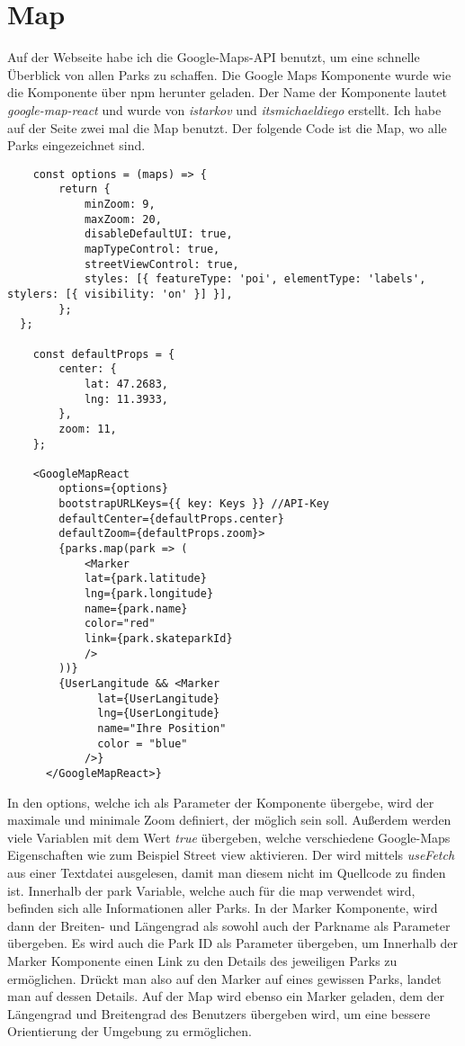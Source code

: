 \section{Map}
\label{map}

Auf der Webseite habe ich die Google-Maps-API benutzt, um eine schnelle Überblick von allen Parks
zu schaffen. Die Google Maps Komponente wurde wie die  Komponente über npm 
herunter geladen. Der Name der Komponente lautet \textit{google-map-react} und wurde von \textit{istarkov}
und \textit{itsmichaeldiego} erstellt. Ich habe auf der Seite zwei mal die Map benutzt. Der folgende 
Code ist die Map, wo alle Parks eingezeichnet sind.

\begin{lstlisting}
    const options = (maps) => {
        return {
            minZoom: 9,
            maxZoom: 20,
            disableDefaultUI: true,
            mapTypeControl: true,
            streetViewControl: true,
            styles: [{ featureType: 'poi', elementType: 'labels', stylers: [{ visibility: 'on' }] }],
        };
  };

    const defaultProps = {
        center: {
            lat: 47.2683,
            lng: 11.3933,
        },
        zoom: 11,
    };
    
    <GoogleMapReact
        options={options}
        bootstrapURLKeys={{ key: Keys }} //API-Key
        defaultCenter={defaultProps.center}
        defaultZoom={defaultProps.zoom}>
        {parks.map(park => (
            <Marker
            lat={park.latitude}
            lng={park.longitude}
            name={park.name}
            color="red"
            link={park.skateparkId}
            />  
        ))}
        {UserLangitude && <Marker
              lat={UserLangitude}
              lng={UserLongitude}
              name="Ihre Position"
              color = "blue"
            />}
      </GoogleMapReact>}
\end{lstlisting}

In den options, welche ich als Parameter der Komponente übergebe, wird der maximale und minimale Zoom 
definiert, der möglich sein soll. Außerdem werden viele Variablen mit dem Wert \textit{true} übergeben, 
welche verschiedene Google-Maps Eigenschaften wie zum Beispiel Street view aktivieren. Der 
wird mittels \textit{useFetch} aus einer Textdatei ausgelesen, damit man diesem nicht im Quellcode zu 
finden ist. Innerhalb der park Variable, welche auch für die map verwendet wird, befinden sich alle 
Informationen aller Parks. In der Marker Komponente, wird dann der Breiten- und Längengrad als sowohl auch
der Parkname als Parameter übergeben. Es wird auch die Park ID als Parameter übergeben, um Innerhalb der 
Marker Komponente einen Link zu den Details des jeweiligen Parks zu ermöglichen. Drückt man also auf den Marker 
auf eines gewissen Parks, landet man auf dessen Details. Auf der Map wird ebenso ein Marker geladen, dem 
der Längengrad und Breitengrad des Benutzers übergeben wird, um eine bessere Orientierung der Umgebung 
zu ermöglichen.


